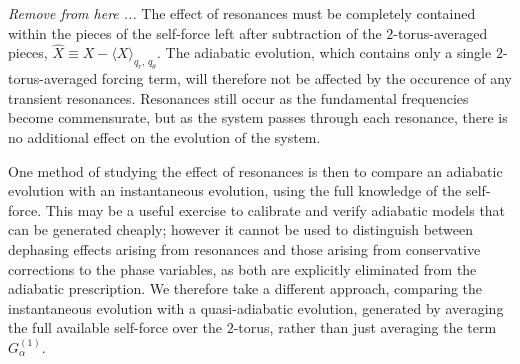 \documentclass[aps,prd,amsfonts,amssymb,amsmath,nofootinbib,showpacs,superscriptaddress,twocolumn]{revtex4}
\newcommand{\figref}[1]{Fig.\ \ref{fig:#1}}
\newcommand{\dd}{\ensuremath{\mathrm{d}}}
\newcommand{\diff}[2]{\ensuremath{\dfrac{\dd {#1}}{\dd {#2}}}}
\newcommand{\intd}[4]{\ensuremath{\int_{#1}^{#2}{#3}\,\dd{#4}}}
\begin{document}

\emph{Remove from here ...}
The effect of resonances must be completely contained within the pieces of the self-force left after subtraction of the $2$-torus-averaged pieces, $\hat{X}\equiv X-\langle X\rangle_{q_r,\,q_\theta}$. The adiabatic evolution, which contains only a single $2$-torus-averaged forcing term, will therefore not be affected by the occurence of any transient resonances. Resonances still occur as the fundamental frequencies become commensurate, but as the system passes through each resonance, there is no additional effect on the evolution of the system.

One method of studying the effect of resonances is then to compare an adiabatic evolution with an instantaneous evolution, using the full knowledge of the self-force. This may be a useful exercise to calibrate and verify adiabatic models that can be generated cheaply; however it cannot be used to distinguish between dephasing effects arising from resonances and those arising from conservative corrections to the phase variables, as both are explicitly eliminated from the adiabatic prescription. We therefore take a different approach, comparing the instantaneous evolution with a quasi-adiabatic evolution, generated by averaging the full available self-force over the $2$-torus, rather than just averaging the term $G_\alpha^{(1)}$.
\end{document}
